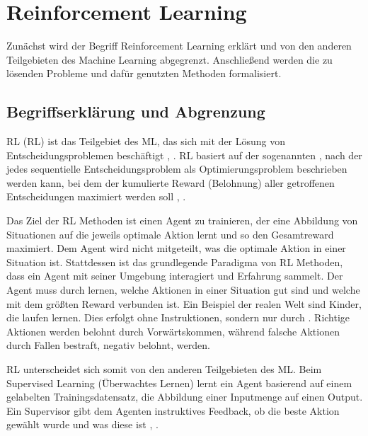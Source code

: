 \section{Reinforcement Learning}
Zunächst wird der Begriff Reinforcement Learning erklärt und von den anderen Teilgebieten des Machine Learning abgegrenzt.
Anschließend werden die zu lösenden Probleme und dafür genutzten Methoden formalisiert.

\subsection{Begriffserklärung und Abgrenzung}
\label{begriffserklaerung}
\acl{RL} (\ac{RL}) ist das Teilgebiet des \acl{ML}, das sich mit der Lösung von Entscheidungsproblemen beschäftigt \cite[S. 1]{suttonReinforcementLearningIntroduction2018}, \cite[S. 1]{vanderreeReinforcementLearningGame2013}.
\ac{RL} basiert auf der sogenannten , nach der jedes sequentielle Entscheidungsproblem als Optimierungsproblem beschrieben werden kann, bei dem der kumulierte Reward (\dt Belohnung) aller getroffenen Entscheidungen maximiert werden soll \cite[S. 53]{suttonReinforcementLearningIntroduction2018}, \cite[S. 24]{kontesg.SeminarReinforcementLearning2021}.

Das Ziel der \ac{RL} Methoden ist einen Agent zu trainieren, der eine Abbildung von Situationen auf die jeweils optimale Aktion lernt und so den Gesamtreward maximiert. 
Dem Agent wird nicht mitgeteilt, was die optimale Aktion in einer Situation ist. 
Stattdessen ist das grundlegende Paradigma von \ac{RL} Methoden, dass ein Agent mit seiner Umgebung interagiert und Erfahrung sammelt. 
Der Agent muss durch  lernen, welche Aktionen in einer Situation gut sind und welche mit dem größten Reward verbunden ist. \cite[S. 1ff.]{suttonReinforcementLearningIntroduction2018}
Ein Beispiel der realen Welt sind Kinder, die laufen lernen. Dies erfolgt ohne Instruktionen, sondern nur durch . 
Richtige Aktionen werden belohnt durch Vorwärtskommen, während falsche Aktionen durch Fallen bestraft, \dahe negativ belohnt, werden. \cite[S. 289]{ertelIntroductionArtificialIntelligence2017}

\ac{RL} unterscheidet sich somit von den anderen Teilgebieten des \ac{ML}. Beim Supervised Learning (\dt Überwachtes Lernen) lernt ein Agent basierend auf einem gelabelten Trainingsdatensatz, die Abbildung einer Inputmenge auf einen Output. Ein Supervisor gibt dem Agenten instruktives Feedback, ob die beste Aktion gewählt wurde und was diese ist \cite[S. 289f.]{ertelIntroductionArtificialIntelligence2017}, \cite[S. 2]{suttonReinforcementLearningIntroduction2018}.

